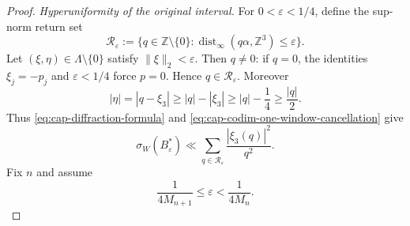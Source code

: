\documentclass[10pt,a4paper]{amsart}
\begin{document}
\begin{proof}
\smallskip\noindent\emph{Hyperuniformity of the original interval.}
For
$0<\varepsilon<1/4$, define the sup-norm return set
\begin{equation}\label{eq:cap-codim-one-return-set}
  \mathcal R_\varepsilon
  :=\{q\in\mathbb Z\setminus\{0\}:
       \operatorname{dist}_\infty(q\alpha,\mathbb Z^3)\leq\varepsilon\}.
\end{equation}
Let $(\xi,\eta)\in\Lambda\setminus\{0\}$ satisfy
$\|\xi\|_2<\varepsilon$.  Then $q\neq0$: if $q=0$, the identities
$\xi_j=-p_j$ and $\varepsilon<1/4$ force $p=0$.  Hence
$q\in\mathcal R_\varepsilon$.  Moreover
\[
  |\eta|=|q-\xi_3|
  \geq |q|-|\xi_3|
  \geq |q|-\frac14
  \geq\frac{|q|}{2}.
\]
Thus \eqref{eq:cap-diffraction-formula} and
\eqref{eq:cap-codim-one-window-cancellation} give
\begin{equation}\label{eq:cap-codim-one-hu1-sum}
  \sigma_W(B_\varepsilon^*)
  \ll
  \sum_{q\in\mathcal R_\varepsilon}
    \frac{|\xi_3(q)|^2}{q^2}.
\end{equation}
Fix $n$ and assume
\begin{equation}\label{eq:cap-codim-one-epsilon-scale}
  \frac1{4M_{n+1}}\leq\varepsilon<\frac1{4M_n}.
\end{equation}


\end{proof}
\end{document}
